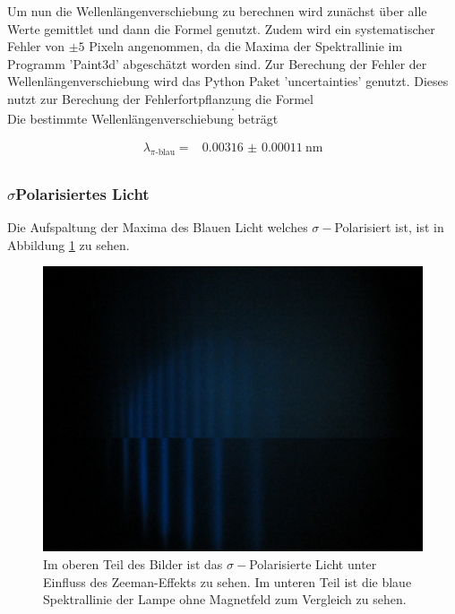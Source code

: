 Um nun die Wellenlängenverschiebung zu berechnen wird zunächst über alle Werte gemittlet und dann die Formel
%
genutzt.
Zudem wird ein systematischer Fehler von $\pm 5$ Pixeln angenommen, da die Maxima der Spektrallinie im Programm 'Paint3d' \cite{paint3d} abgeschätzt worden sind.
Zur Berechung der Fehler der Wellenlängenverschiebung wird das Python Paket 'uncertainties' \cite{uncertainties} genutzt.
Dieses nutzt zur Berechung der Fehlerfortpflanzung die Formel
\begin{equation}
    .
    \label{eq:fehler_Wellenlängenverschiebung}
\end{equation}
Die bestimmte Wellenlängenverschiebung beträgt

\begin{align*}
    \lambda _\text{$\pi$-blau} = & \SI{0.00316(011)}{\nano\meter} \\
\end{align*}

\subsubsection{\texorpdfstring{$\sigma$}-Polarisiertes Licht}

Die Aufspaltung der Maxima des Blauen Licht welches $\sigma -$Polarisiert ist, ist in Abbildung \ref{fig:sigma-blau} zu sehen.

\begin{figure}
    \centering
    \includegraphics[width=\textwidth]{content/data/Blue_sigma_0_uebernander.JPG}
    \caption{Im oberen Teil des Bilder ist das $\sigma -$Polarisierte Licht unter Einfluss des Zeeman-Effekts zu sehen. Im unteren Teil ist die blaue Spektrallinie der Lampe ohne Magnetfeld zum Vergleich zu sehen.}
    \label{fig:sigma-blau}
\end{figure}


